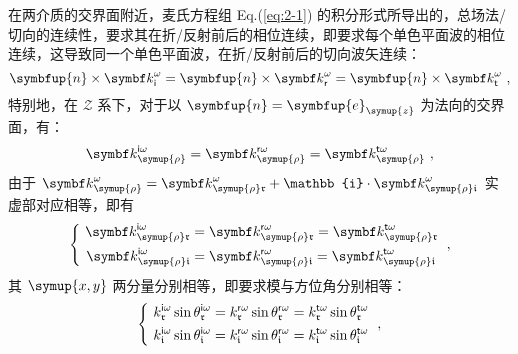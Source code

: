 在两介质的交界面附近，麦氏方程组 Eq.(\ref{eq:2-1}) 的积分形式所导出的，总场法/切向的连续性，要求其在折/反射前后的相位连续，即要求每个单色平面波的相位连续，这导致同一个单色平面波，在折/反射前后的切向波矢连续：
\begin{equation} \label{eq:2-95}
	\abovedisplayskip=16pt
	\belowdisplayskip=16pt
	\symbfup{n} \times {\symbf k}^\omega_{\mathsf{i}} = \symbfup{n} \times {\symbf k}^\omega_{\mathsf{r}} = \symbfup{n} \times {\symbf k}^\omega_{\mathsf{t}} ~,
\end{equation}
特别地，在 $\mathcal{Z}$ 系下，对于以 $\symbfup{n} = \symbfup{e}_{\symup{z}}$ 为法向的交界面，有：
\begin{equation} \label{eq:2-96}
	\abovedisplayskip=16pt
	\belowdisplayskip=16pt
	{\symbf k}^{\mathsf{i}\omega}_{\symup{\rho}} = {\symbf k}^{\mathsf{r}\omega}_{\symup{\rho}} = {\symbf k}^{\mathsf{t}\omega}_{\symup{\rho}} ~,
\end{equation}
由于 ${\symbf k}^\omega_{\symup{\rho}} = {\symbf k}^\omega_{\symup{\rho}\mathfrak{r}} + \mathbb{i} \cdot {\symbf k}^\omega_{\symup{\rho}\mathfrak{i}}$ 实虚部对应相等，即有
\begin{equation} \label{eq:2-97}
	\abovedisplayskip=16pt
	\belowdisplayskip=16pt
	\left\{\ \begin{aligned} {\symbf k}^{\mathsf{i}\omega}_{\symup{\rho}\mathfrak{r}} &= {\symbf k}^{\mathsf{r}\omega}_{\symup{\rho}\mathfrak{r}} = {\symbf k}^{\mathsf{t}\omega}_{\symup{\rho}\mathfrak{r}} \\ {\symbf k}^{\mathsf{i}\omega}_{\symup{\rho}\mathfrak{i}} &= {\symbf k}^{\mathsf{r}\omega}_{\symup{\rho}\mathfrak{i}} = {\symbf k}^{\mathsf{t}\omega}_{\symup{\rho}\mathfrak{i}} \end{aligned}\right. ~,
\end{equation}
其 $\symup{x,y}$ 两分量分别相等，即要求模与方位角分别相等：
\begin{equation} \label{eq:2-98}
	\abovedisplayskip=16pt
	\belowdisplayskip=6pt
	\left\{\ \begin{aligned} {k}^{\mathsf{i}\omega}_{\mathfrak{r}} \sin \theta^{\mathsf{i}\omega}_{\mathfrak{r}} &= {k}^{\mathsf{r}\omega}_{\mathfrak{r}} \sin \theta^{\mathsf{r}\omega}_{\mathfrak{r}} = {k}^{\mathsf{t}\omega}_{\mathfrak{r}} \sin \theta^{\mathsf{t}\omega}_{\mathfrak{r}} \\ {k}^{\mathsf{i}\omega}_{\mathfrak{i}} \sin \theta^{\mathsf{i}\omega}_{\mathfrak{i}} &= {k}^{\mathsf{r}\omega}_{\mathfrak{i}} \sin \theta^{\mathsf{r}\omega}_{\mathfrak{i}} = {k}^{\mathsf{t}\omega}_{\mathfrak{i}} \sin \theta^{\mathsf{t}\omega}_{\mathfrak{i}} \end{aligned}\right. ~,
\end{equation}
